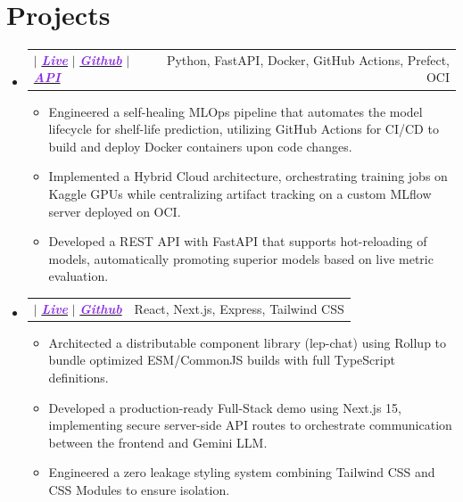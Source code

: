 \documentclass[a4paper,11pt]{article}
\makeatletter
\newcommand{\resumeItem}[1]{
  \item\small{
    {#1 \vspace{-0pt}}
  }
}
\newcommand{\resumeProjectHeading}[2]{
    \item
    \begin{tabular*}{1\textwidth}{l@{\extracolsep{\fill}}r}
      \small#1 & #2 \\
    \end{tabular*}\vspace{-5pt}
}
\newcommand{\resumeSubHeadingListStart}{\begin{itemize}[leftmargin=0in, label={}]}
\newcommand{\resumeSubHeadingListEnd}{\end{itemize}}
\newcommand{\resumeItemListStart}{\begin{itemize}[leftmargin=0.15in, nosep]}
\newcommand{\resumeItemListEnd}{\end{itemize}\vspace{-2pt}}
\makeatother
\begin{document}
\section{\Large{Projects}}
\resumeSubHeadingListStart
\resumeProjectHeading
{\textbf{\large{\AvocadoTitle}} $|$ \emph{\href{\AvocadoLiveURL}{\textcolor{BlueViolet}{\textbf{Live}}}} $|$ \emph{\href{\AvocadoGithubURL}{\textcolor{BlueViolet}{\textbf{Github}}}} $|$ \emph{\href{\AvocadoAPIURL}{\textcolor{BlueViolet}{\textbf{API}}}}}
{Python, FastAPI, Docker, GitHub Actions, Prefect, OCI}
\resumeItemListStart
\vspace{2pt}
\resumeItem{Engineered a self-healing MLOps pipeline that automates the model lifecycle for shelf-life prediction, utilizing GitHub Actions for CI/CD to build and deploy Docker containers upon code changes.}
\resumeItem{Implemented a Hybrid Cloud architecture, orchestrating training jobs on Kaggle GPUs while centralizing artifact tracking on a custom MLflow server deployed on OCI.}
\resumeItem{Developed a REST API with FastAPI that supports hot-reloading of models, automatically promoting superior models based on live metric evaluation.}
\resumeItemListEnd
\resumeProjectHeading
{\textbf{\large{\ChatTitle}} $|$ \emph{\href{\ChatLiveURL}{\textcolor{BlueViolet}{\textbf{Live}}}} $|$ \emph{\href{\ChatGithubURL}{\textcolor{BlueViolet}{\textbf{Github}}}}}
{React, Next.js, Express, Tailwind CSS}
\resumeItemListStart
\resumeItem{Architected a distributable component library (lep-chat) using Rollup to bundle optimized ESM/CommonJS builds with full TypeScript definitions.}
\resumeItem{Developed a production-ready Full-Stack demo using Next.js 15, implementing secure server-side API routes to orchestrate communication between the frontend and Gemini LLM.}
\resumeItem{Engineered a zero leakage styling system combining Tailwind CSS and CSS Modules to ensure isolation.}
\resumeItemListEnd
\resumeSubHeadingListEnd
\end{document}
